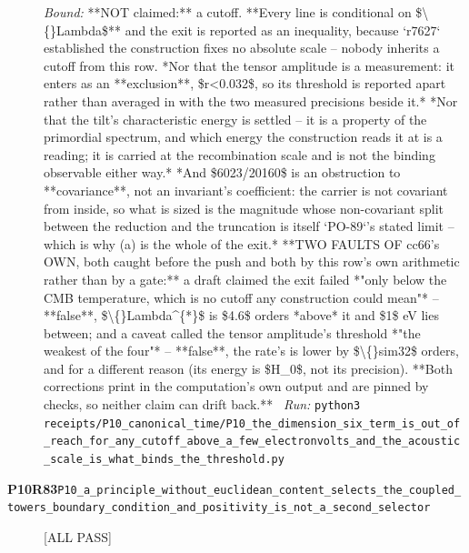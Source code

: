 \begin{description}
 \emph{Bound:} **NOT claimed:** a cutoff. **Every line is conditional on \$\textbackslash\{\}Lambda\$** and the exit is reported as an inequality, because `r7627` established the construction fixes no absolute scale -- nobody inherits a cutoff from this row.  *Nor that the tensor amplitude is a measurement: it enters as an **exclusion**, \$r<0.032\$, so its threshold is reported apart rather than averaged in with the two measured precisions beside it.*  *Nor that the tilt's characteristic energy is settled -- it is a property of the primordial spectrum, and which energy the construction reads it at is a reading; it is carried at the recombination scale and is not the binding observable either way.*  *And \$6023/20160\$ is an obstruction to **covariance**, not an invariant's coefficient: the carrier is not covariant from inside, so what is sized is the magnitude whose non-covariant split between the reduction and the truncation is itself `PO-89`'s stated limit -- which is why (a) is the whole of the exit.*  **TWO FAULTS OF cc66's OWN, both caught before the push and both by this row's own arithmetic rather than by a gate:** a draft claimed the exit failed *"only below the CMB temperature, which is no cutoff any construction could mean"* -- **false**, \$\textbackslash\{\}Lambda\textasciicircum{}\{*\}\$ is \$4.6\$ orders *above* it and \$1\$ eV lies between; and a caveat called the tensor amplitude's threshold *"the weakest of the four"* -- **false**, the rate's is lower by \$\textbackslash\{\}sim32\$ orders, and for a different reason (its energy is \$H\_0\$, not its precision). **Both corrections print in the computation's own output and are pinned by checks, so neither claim can drift back.**
\ \emph{Run:} \texttt{python3 receipts/P10\_canonical\_time/P10\_the\_dimension\_six\_term\_is\_out\_of\_reach\_for\_any\_cutoff\_above\_a\_few\_electronvolts\_and\_the\_acoustic\_scale\_is\_what\_binds\_the\_threshold.py}
\item[\rcptlabel{P10_a_principle_without_euclidean_content_selects_the_coupled_towers_boundary_condition_and_positivity_is_not_a_second_selector}{P10R83}\textbf{P10R83}\quad\texttt{P10\_a\_principle\_without\_euclidean\_content\_selects\_the\_coupled\_towers\_boundary\_condition\_and\_positivity\_is\_not\_a\_second\_selector}]\hfill\textsf{[ALL PASS]}\\

\end{description}
